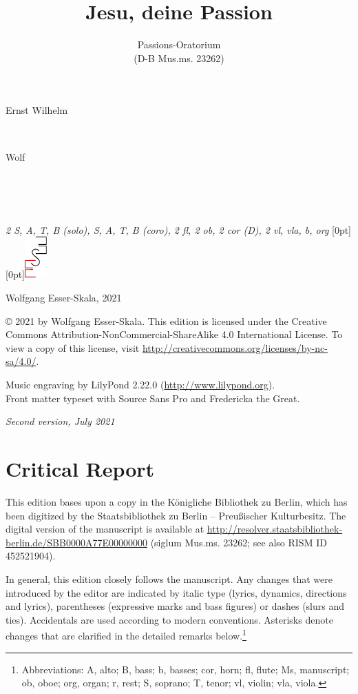 \documentclass[parskip=full]{scrreprt}
\makeatletter
\DeclareRobustCommand{\sbseries}{\fontseries{sb}\selectfont}
\newcommand\fancytitlehead{
  \headingfont%
  \fontsize{80}{80}\selectfont\textcolor{black!80}{\@ifundefined{@shortname}{\@lastname}{\@shortname}.}\\[15pt]%
  \fontsize{55}{55}\selectfont\@ifundefined{@shorttitle}{\@title}{\@shorttitle}.%
}
\def\firstname#1{\def\@firstname{#1}}
\def\lastname#1{\def\@lastname{#1}}
\def\scoring#1{\def\@scoring{#1}}
\def\maketitle{%
\begin{titlepage}%
  \Large%
  {\@titlehead}%
  \vfill%
  {\strut\@firstname}\\%
  {\sbseries\color{oldred}\strut\@lastname}\\%
  {\strut\@namesuffix}%
  \vfill%
  {\sbseries\@title}\\%
  {\@subtitle}\\[\baselineskip]%
  {\itshape\@scoring}%
  \vfill%
  {\itshape\@parts}\hspace*{\fill}\raisebox{0pt}[0pt][0pt]{\includegraphics{ees_logo}}%
\end{titlepage}%
}
\newif\ifprintreport\printreportfalse
\makeatother
\begin{document}
\frenchspacing

\titlehead{\fancytitlehead}
\firstname{Ernst Wilhelm}
\lastname{Wolf}
\title{Jesu, deine Passion}
\subtitle{Passions-Oratorium\\(D-B Mus.ms. 23262)}
\scoring{2 S, A, T, B (solo), S, A, T, B (coro), 2 fl, 2 ob, 2 cor (D), 2 vl, vla, b, org}
\maketitle


\thispagestyle{empty}

\vspace*{\fill}

\hspace*{1em}Wolfgang Esser-Skala, 2021

© 2021 by Wolfgang Esser-Skala. This edition is licensed under the Creative Commons Attribution-NonCommercial-ShareAlike 4.0 International License. To view a copy of this license, visit \url{http://creativecommons.org/licenses/by-nc-sa/4.0/}.

Music engraving by LilyPond 2.22.0 (\url{http://www.lilypond.org}).\\
Front matter typeset with Source Sans Pro and Fredericka the Great.

\textit{Second version, July 2021}

\vspace*{2cm}

\ifprintreport
\chapter*{Critical Report}

This edition bases upon a copy in the Königliche Bibliothek zu Berlin, which has been digitized by the Staatsbibliothek zu Berlin – Preußischer Kulturbesitz. The digital version of the manuscript is available at \url{http://resolver.staatsbibliothek-berlin.de/SBB0000A77E00000000} (siglum Mus.ms. 23262; see also RISM ID 452521904).

In general, this edition closely follows the manuscript. Any changes that were introduced by the editor are indicated by italic type (lyrics, dynamics, directions and lyrics), parentheses (expressive marks and bass figures) or dashes (slurs and ties). Accidentals are used according to modern conventions. Asterisks denote changes that are clarified in the detailed remarks below.\footnote{Abbreviations: A, alto; B, bass; b, basses; cor, horn; fl, flute; Ms, manuscript; ob, oboe; org, organ; r, rest; S, soprano; T, tenor; vl, violin; vla, viola.}
\end{document}
